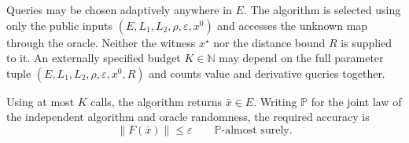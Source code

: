 \documentclass[10pt]{article}
\theoremstyle{definition}
\begin{document}
Queries may be chosen adaptively anywhere in $E$. The algorithm is selected using only the public inputs $(E,L_1,L_2,\rho,\varepsilon,x^0)$ and accesses the unknown map through the oracle. Neither the witness $x^\star$ nor the distance bound $R$ is supplied to it. An externally specified budget $K\in\mathbb{N}$ may depend on the full parameter tuple $(E,L_1,L_2,\rho,\varepsilon,x^0,R)$ and counts value and derivative queries together.

Using at most $K$ calls, the algorithm returns $\bar{x}\in E$. Writing $\mathbb{P}$ for the joint law of the independent algorithm and oracle randomness, the required accuracy is
\[
\|F(\bar{x})\|\leq\varepsilon
\qquad\mathbb{P}\text{-almost surely}.
\]
\end{document}
